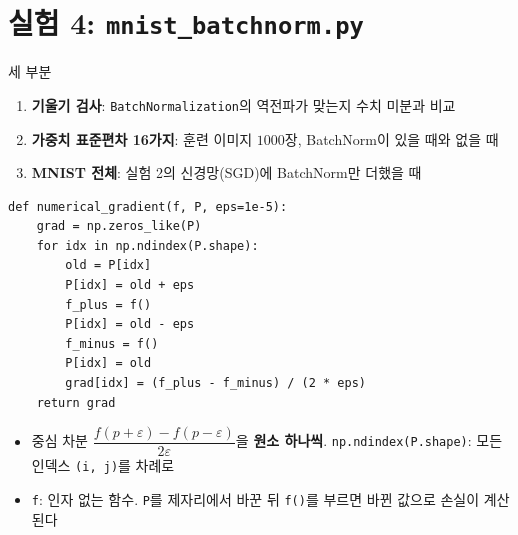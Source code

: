 \documentclass[aspectratio=169,11pt]{beamer}
\newcommand{\code}[1]{\texttt{#1}}
\begin{document}
\section{실험 4: \texttt{mnist\_batchnorm.py}}

\begin{frame}{세 부분}
\small
\begin{enumerate}
\item \textbf{기울기 검사}: \code{BatchNormalization}의 역전파가 맞는지 수치 미분과 비교
\item \textbf{가중치 표준편차 16가지}: 훈련 이미지 $1000$장, BatchNorm이 있을 때와 없을 때
\item \textbf{MNIST 전체}: 실험 2의 신경망(SGD)에 BatchNorm만 더했을 때
\end{enumerate}
\begin{lstlisting}
def numerical_gradient(f, P, eps=1e-5):
    grad = np.zeros_like(P)
    for idx in np.ndindex(P.shape):
        old = P[idx]
        P[idx] = old + eps
        f_plus = f()
        P[idx] = old - eps
        f_minus = f()
        P[idx] = old
        grad[idx] = (f_plus - f_minus) / (2 * eps)
    return grad
\end{lstlisting}
\small
\begin{itemize}
\item 중심 차분 $\dfrac{f(p+\varepsilon)-f(p-\varepsilon)}{2\varepsilon}$을 \textbf{원소 하나씩}. \code{np.ndindex(P.shape)}: 모든 인덱스 \code{(i, j)}를 차례로
\item \code{f}: 인자 없는 함수. \code{P}를 제자리에서 바꾼 뒤 \code{f()}를 부르면 바뀐 값으로 손실이 계산된다
\end{itemize}
\end{frame}
\end{document}

